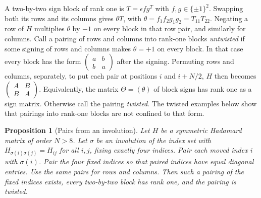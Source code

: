 \documentclass[11pt,reqno]{amsart}
\newtheorem{proposition}[theorem]{Proposition}
\theoremstyle{remark}\newtheorem{remark}[theorem]{Remark}
\begin{document}
A two-by-two sign block of rank one is \(T=\epsilon fg^T\) with \(f,g\in\{\pm1\}^2\). Swapping both its rows and its columns gives \(\theta T\), with \(\theta=f_1f_2g_1g_2=T_{11}T_{22}\). Negating a row of \(H\) multiplies \(\theta\) by \(-1\) on every block in that row pair, and similarly for columns. Call a pairing of rows and columns into rank-one blocks \emph{untwisted} if some signing of rows and columns makes \(\theta=+1\) on every block. In that case every block has the form \(\left(\begin{smallmatrix}a&b\\b&a\end{smallmatrix}\right)\) after the signing. Permuting rows and columns, separately, to put each pair at positions \(i\) and \(i+N/2\), \(H\) then becomes \(\left(\begin{smallmatrix}A&B\\B&A\end{smallmatrix}\right)\). Equivalently, the matrix \(\Theta=(\theta)\) of block signs has rank one as a sign matrix. Otherwise call the pairing \emph{twisted}. The twisted examples below show that pairings into rank-one blocks are not confined to that form.

\begin{proposition}[Pairs from an involution]\label{prop:sizetwo}
Let \(H\) be a symmetric Hadamard matrix of order \(N>8\). Let \(\sigma\) be an involution of the index set with \(H_{\sigma(i)\sigma(j)}=H_{ij}\) for all \(i,j\), fixing exactly four indices. Pair each moved index \(i\) with \(\sigma(i)\). Pair the four fixed indices so that paired indices have equal diagonal entries. Use the same pairs for rows and columns. Then such a pairing of the fixed indices exists, every two-by-two block has rank one, and the pairing is twisted.
\end{proposition}
\end{document}
